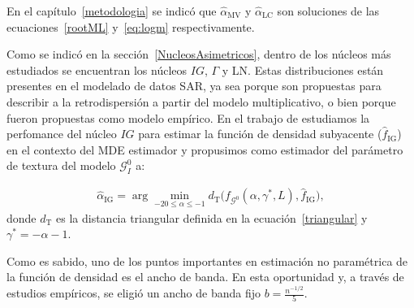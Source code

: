 En el capítulo~\ref{metodologia} se indicó que $\widehat{\alpha}_\text{MV}$ y $\widehat{\alpha}_\text{LC}$ son soluciones de las ecuaciones~\eqref{rootML} y~\eqref{eq:logm} respectivamente.


Como se indicó en la sección~\ref{NucleosAsimetricos}, dentro de los núcleos más estudiados se encuentran los núcleos $IG$, $\Gamma$ y LN. Estas distribuciones están presentes en el modelado de datos SAR, ya sea porque son propuestas para describir a la retrodispersión a partir del modelo multiplicativo, o bien porque fueron propuestas como modelo empírico. En el trabajo de \citet{gambini2015} estudiamos la perfomance del núcleo $IG$ para estimar la función de densidad subyacente ($\widehat f_\text{IG}$) en el contexto del MDE estimador y propusimos como estimador del parámetro de textura del modelo $\mathcal{G}_I^0$ a:

\begin{align}
\widehat{\alpha}_{\text{IG}}= \arg\min_{-20\leq \alpha \leq -1} d_{\text{T}}\big(f_{\mathcal{G}^{0}}(\alpha,\gamma^*, L ), \widehat f_\text{IG}\big),
\label{minimization}
\end{align}
donde $d_{\text{T}}$ es la distancia triangular definida en la ecuación~\eqref{triangular} y $\gamma^*=-\alpha-1$.  

Como es sabido, uno de los puntos importantes en estimación no paramétrica de la función de densidad es el ancho de banda. En esta oportunidad y, a través de estudios empíricos, se eligió un ancho de banda fijo $b=\frac{n^{-1/2}}{5}$.


